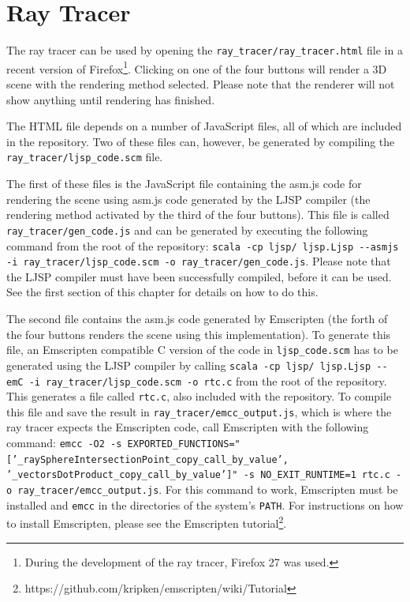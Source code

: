 \documentclass[11pt]{report}
\begin{document}
\section{Ray Tracer}

The ray tracer can be used by opening the \texttt{ray_tracer/ray_tracer.html} file in a recent version of Firefox\footnote{During the development of the ray tracer, Firefox 27 was used.}. Clicking on one of the four buttons will render a 3D scene with the rendering method selected. Please note that the renderer will not show anything until rendering has finished. 

The HTML file depends on a number of JavaScript files, all of which are included in the repository. Two of these files can, however, be generated by compiling the \texttt{ray_tracer/ljsp_code.scm} file.

The first of these files is the JavaScript file containing the asm.js code for rendering the scene using asm.js code generated by the LJSP compiler (the rendering method activated by the third of the four buttons). This file is called \texttt{ray_tracer/gen_code.js} and can be generated by executing the following command from the root of the repository: \texttt{scala -cp ljsp/ ljsp.Ljsp {-}-asmjs -i ray_tracer/ljsp_code.scm -o ray_tracer/gen_code.js}. Please note that the LJSP compiler must have been successfully compiled, before it can be used. See the first section of this chapter for details on how to do this.

The second file contains the asm.js code generated by Emscripten (the forth of the four buttons renders the scene using this implementation). To generate this file, an Emscripten compatible C version of the code in \texttt{ljsp_code.scm} has to be generated using the LJSP compiler by calling \texttt{scala -cp ljsp/ ljsp.Ljsp {-}-emC -i ray_tracer/ljsp_code.scm -o rtc.c} from the root of the repository. This generates a file called \texttt{rtc.c}, also included with the repository. To compile this file and save the result in \texttt{ray_tracer/emcc_output.js}, which is where the ray tracer expects the Emscripten code, call Emscripten with the following command: \texttt{emcc -O2 -s EXPORTED_FUNCTIONS="['_raySphereIntersectionPoint_copy_call_by_value', '_vectorsDotProduct_copy_call_by_value']" -s NO_EXIT_RUNTIME=1 rtc.c -o ray_tracer/emcc_output.js}. For this command to work, Emscripten must be installed and \texttt{emcc} in the directories of the system's \texttt{PATH}. For instructions on how to install Emscripten, please see the Emscripten tutorial\footnote{https://github.com/kripken/emscripten/wiki/Tutorial}.
\end{document}
